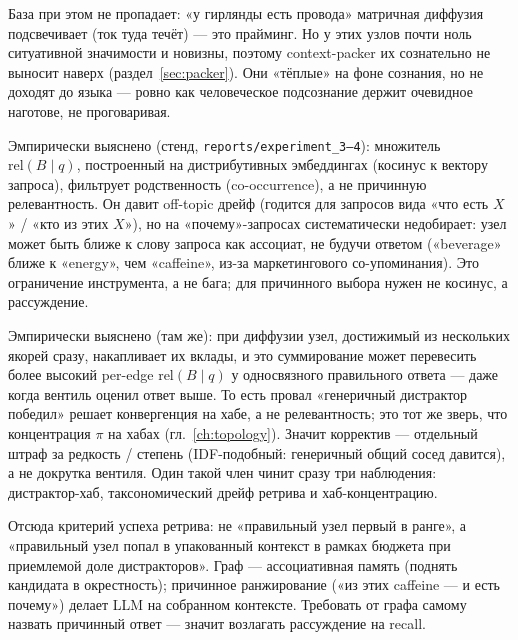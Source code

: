 \begin{intuition}
База при этом не пропадает: «у гирлянды есть провода» матричная диффузия
подсвечивает (ток туда течёт) --- это прайминг. Но у этих узлов почти ноль
ситуативной значимости и новизны, поэтому context-packer их сознательно не
выносит наверх (раздел~\ref{sec:packer}). Они «тёплые» на фоне сознания, но не
доходят до языка --- ровно как человеческое подсознание держит очевидное
наготове, не проговаривая.
\end{intuition}

\begin{principle}
Эмпирически выяснено (стенд, \texttt{reports/experiment\_3--4}): множитель
$\mathrm{rel}(B \mid q)$, построенный на дистрибутивных эмбеддингах (косинус к
вектору запроса), фильтрует родственность (co-occurrence), а не причинную
релевантность. Он давит off-topic дрейф (годится для запросов вида «что есть
$X$» / «кто из этих $X$»), но на «почему»-запросах систематически
недобирает: узел может быть ближе к слову запроса как ассоциат, не будучи
ответом («beverage» ближе к «energy», чем «caffeine», из-за маркетингового
со-упоминания). Это ограничение инструмента, а не бага; для причинного выбора
нужен не косинус, а рассуждение.
\end{principle}

\begin{principle}
Эмпирически выяснено (там же): при диффузии узел, достижимый из нескольких
якорей сразу, накапливает их вклады, и это суммирование может перевесить более
высокий per-edge $\mathrm{rel}(B \mid q)$ у односвязного правильного ответа ---
даже когда вентиль оценил ответ выше. То есть провал «генеричный дистрактор
победил» решает конвергенция на хабе, а не релевантность; это тот же зверь,
что концентрация $\pi$ на хабах (гл.~\ref{ch:topology}). Значит корректив ---
отдельный штраф за редкость / степень (IDF-подобный: генеричный общий сосед
давится), а не докрутка вентиля. Один такой член чинит сразу три наблюдения:
дистрактор-хаб, таксономический дрейф ретрива и хаб-концентрацию.
\end{principle}

\begin{principle}
Отсюда критерий успеха ретрива: не «правильный узел первый в ранге», а
«правильный узел попал в упакованный контекст в рамках бюджета при приемлемой
доле дистракторов». Граф --- ассоциативная память (поднять кандидата в
окрестность); причинное ранжирование («из этих caffeine --- и есть почему»)
делает LLM на собранном контексте. Требовать от графа самому назвать причинный
ответ --- значит возлагать рассуждение на recall.
\end{principle}

